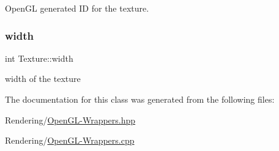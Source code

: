Open\+GL generated ID for the texture. 

\mbox{\label{classTexture_a06a0246cb31343557c3441c5733349cd}} 
\subsubsection{\texorpdfstring{width}{width}}
{\footnotesize\ttfamily int Texture\+::width}



width of the texture 



The documentation for this class was generated from the following files\+:\begin{DoxyCompactItemize}
\item 
Rendering/\mbox{\hyperlink{OpenGL-Wrappers_8hpp}{Open\+G\+L-\/\+Wrappers.\+hpp}}\item 
Rendering/\mbox{\hyperlink{OpenGL-Wrappers_8cpp}{Open\+G\+L-\/\+Wrappers.\+cpp}}\end{DoxyCompactItemize}
